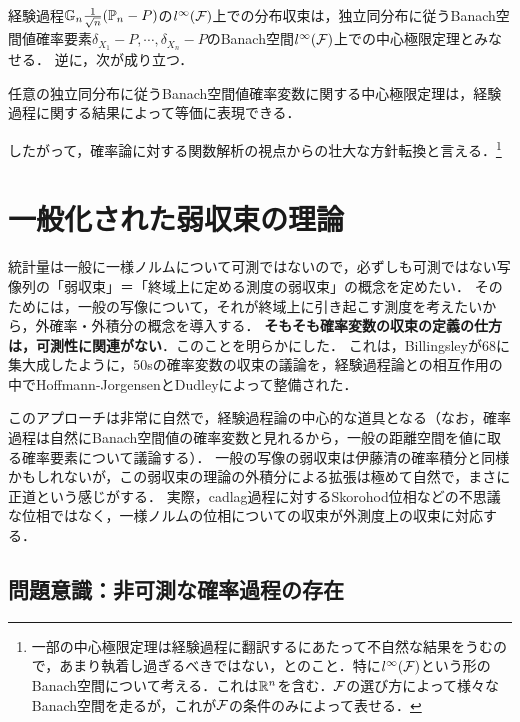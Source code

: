 \documentclass[uplatex,dvipdfmx]{jsreport}
\begin{document}
\begin{discussion}[中心極限定理の翻訳]
    経験過程$\mathbb{G}_n\frac{1}{\sqrt{n}}(\mathbb{P}_n-P)$の$l^\infty(\mathcal{F})$上での分布収束は，独立同分布に従うBanach空間値確率要素$\delta_{X_1}-P,\cdots,\delta_{X_n}-P$のBanach空間$l^\infty(\mathcal{F})$上での中心極限定理とみなせる．
    逆に，次が成り立つ．
    \begin{proposition}
        任意の独立同分布に従うBanach空間値確率変数に関する中心極限定理は，経験過程に関する結果によって等価に表現できる．
    \end{proposition}
    したがって，確率論に対する関数解析の視点からの壮大な方針転換と言える．\footnote{一部の中心極限定理は経験過程に翻訳するにあたって不自然な結果をうむので，あまり執着し過ぎるべきではない，とのこと．特に$l^\infty(\mathcal{F})$という形のBanach空間について考える．これは$\mathbb{R}^n$を含む．$\mathcal{F}$の選び方によって様々なBanach空間を走るが，これが$\mathcal{F}$の条件のみによって表せる．}
\end{discussion}


\section{一般化された弱収束の理論}

\begin{tcolorbox}[colframe=ForestGreen, colback=ForestGreen!10!white,breakable,colbacktitle=ForestGreen!40!white,coltitle=black,fonttitle=\bfseries\sffamily,
title=]
    統計量は一般に一様ノルムについて可測ではないので，必ずしも可測ではない写像列の「弱収束」＝「終域上に定める測度の弱収束」の概念を定めたい．
    そのためには，一般の写像について，それが終域上に引き起こす測度を考えたいから，外確率・外積分の概念を導入する．
    \textbf{そもそも確率変数の収束の定義の仕方は，可測性に関連がない}．このことを明らかにした．
    これは，Billingsleyが68に集大成したように，50sの確率変数の収束の議論を，経験過程論との相互作用の中でHoffmann-JorgensenとDudleyによって整備された．

    このアプローチは非常に自然で，経験過程論の中心的な道具となる（なお，確率過程は自然にBanach空間値の確率変数と見れるから，一般の距離空間を値に取る確率要素について議論する）．
    一般の写像の弱収束は伊藤清の確率積分と同様かもしれないが，この弱収束の理論の外積分による拡張は極めて自然で，まさに正道という感じがする．
    実際，cadlag過程に対するSkorohod位相などの不思議な位相ではなく，一様ノルムの位相についての収束が外測度上の収束に対応する．
\end{tcolorbox}

\subsection{問題意識：非可測な確率過程の存在}
\end{document}
